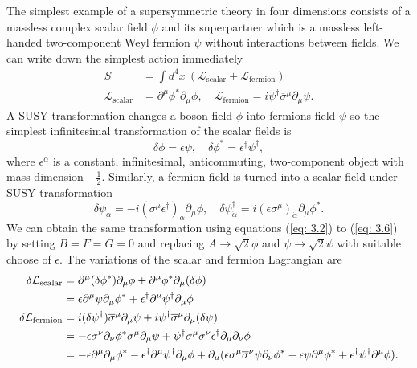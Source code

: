\documentclass[12pt]{report}
\begin{document}
The simplest example of a supersymmetric theory in four dimensions consists of a massless complex scalar field $\phi$ and its superpartner which is a massless left-handed two-component Weyl fermion $\psi$ without interactions between fields.
We can write down the simplest action immediately
\begin{align}
S &= \int d^{4} x \ (\mathcal{L}_{\mathrm{scalar}} + \mathcal{L}_{\mathrm{fermion}})\\
\mathcal{L}_{\mathrm{scalar}} &= \partial^{\mu} \phi^{*} \partial_{\mu} \phi, \quad \mathcal{L}_{\mathrm{fermion}} = i \psi^{\dag} \overline{\sigma}^{\mu} \partial_{\mu} \psi .
\end{align}
A SUSY transformation changes a boson field $\phi$ into fermions field $\psi$ so the simplest infinitesimal transformation of the scalar fields is
\begin{equation} \label{eq: susy transformation for boson fields}
\delta \phi  = \epsilon \psi, \quad \delta \phi^{*} = \epsilon^{\dag} \psi^{\dag} ,
\end{equation}
where $\epsilon^{\alpha}$ is a constant, infinitesimal, anticommuting, two-component object with mass dimension $-\frac{1}{2}$.
Similarly, a fermion field is turned into a scalar field under SUSY transformation
\begin{equation} \label{eq: susy transformation for fermion fields}
\delta \psi_{\alpha} = -i (\sigma^{\mu} \epsilon^{\dag})_{\alpha} \partial_{\mu} \phi, \quad \delta \psi^{\dag}_{\dot{\alpha}} = i (\epsilon \sigma^{\mu})_{\dot{\alpha}} \partial_{\mu} \phi^{*} .
\end{equation}
We can obtain the same transformation using equations (\ref{eq: 3.2}) to (\ref{eq: 3.6}) by setting $B = F = G =0$ and replacing $A \to \sqrt{2} \phi$ and $\psi \to \sqrt{2} \psi$ with suitable choose of $\epsilon$.
The variations of the scalar and fermion Lagrangian are
\begin{align}
\delta \mathcal{L}_{\mathrm{scalar}} &= \partial^{\mu} (\delta \phi^{*}) \partial_{\mu} \phi + \partial^{\mu} \phi^{*} \partial_{\mu} (\delta \phi) \notag \\
&= \epsilon \partial^{\mu} \psi \partial_{\mu} \phi^{*} + \epsilon^{\dag} \partial^{\mu} \psi^{\dag} \partial_{\mu} \phi\\
%
\delta \mathcal{L}_{\mathrm{fermion}} &= i (\delta \psi^{\dag}) \overline{\sigma}^{\mu} \partial_{\mu} \psi + i \psi^{\dag} \overline{\sigma}^{\mu} \partial_{\mu} (\delta \psi) \notag \\
&= -\epsilon \sigma^{\nu} \partial_{\nu} \phi^{*} \overline{\sigma}^{\mu} \partial_{\mu} \psi + \psi^{\dag} \overline{\sigma}^{\mu} \sigma^{\nu} \epsilon^{\dag} \partial_{\mu} \partial_{\nu} \phi \notag \\
&= -\epsilon \partial^{\mu} \partial_{\mu} \phi^{*} - \epsilon^{\dag} \partial^{\mu} \psi^{\dag} \partial_{\mu} \phi
+\partial_{\mu} (\epsilon \sigma^{\mu} \overline{\sigma}^{\nu} \psi \partial_{\nu} \phi^{*} - \epsilon \psi \partial^{\mu} \phi^{*} + \epsilon^{\dag} \psi^{\dag} \partial^{\mu}\phi) .
\end{align}
\end{document}
